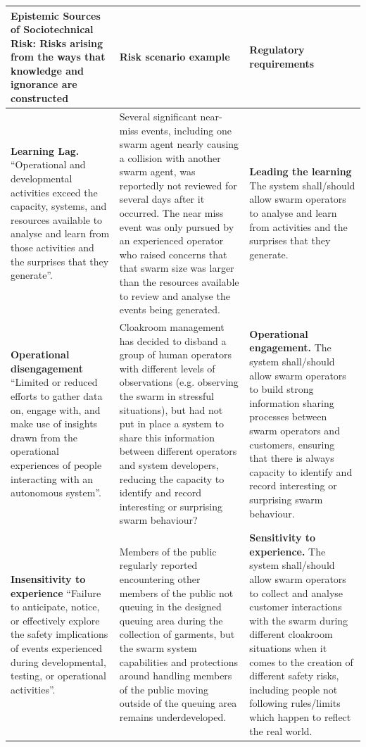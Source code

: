 \documentclass[lettersize,journal]{IEEEtran}
\begin{document}
\begin{landscape}
\begin{table}[]
    \centering
    \begin{tabular}{|p{0.3\textheight}|p{0.35\textheight}|p{0.35\textheight}|}
        \hline
         \textbf{Epistemic Sources of Sociotechnical Risk:} Risks arising from the ways that knowledge and ignorance are constructed & \textbf{Risk scenario example} & \textbf{Regulatory requirements} \\
         \hline
         \textbf{Learning Lag.} ``Operational and developmental activities exceed the capacity, systems, and resources available to analyse and learn from those activities and the surprises that they generate”. \cite{macrae2021learning} & Several significant near-miss events, including one swarm agent nearly causing a collision with another swarm agent, was reportedly not reviewed for several days after it occurred. The near miss event was only pursued by an experienced operator who raised concerns that that swarm size was larger than the resources available to review and analyse the events being generated. & \textbf{Leading the learning} The system shall/should allow swarm operators to analyse and learn from activities and the surprises that they generate. \\
         \hline
         \textbf{Operational disengagement} ``Limited or reduced efforts to gather data on, engage with, and make use of insights drawn from the operational experiences of people interacting with an autonomous system”. \cite{macrae2021learning} & Cloakroom management has decided to disband a group of human operators with different levels of observations (e.g. observing the swarm in stressful situations), but had not put in place a system to share this information between different operators and system developers, reducing the capacity to identify and record interesting or surprising swarm behaviour? & \textbf{Operational engagement.} The system shall/should allow swarm operators to build strong information sharing processes between swarm operators and customers, ensuring that there is always capacity to identify and record interesting or surprising swarm behaviour. \\ 
         \hline
         \textbf{Insensitivity to experience} ``Failure to anticipate, notice, or effectively explore the safety implications of events experienced during developmental, testing, or operational activities”. \cite{macrae2021learning} & Members of the public regularly reported encountering other members of the public not queuing in the designed queuing area during the collection of garments, but the swarm system capabilities and protections around handling members of the public moving outside of the queuing area remains underdeveloped. & \textbf{Sensitivity to experience.} The system shall/should allow swarm operators to collect and analyse customer interactions with the swarm during different cloakroom situations when it comes to the creation of different safety risks, including people not following rules/limits which happen to reflect the real world.\\

\end{tabular}
\end{table}
\end{landscape}
\end{document}
